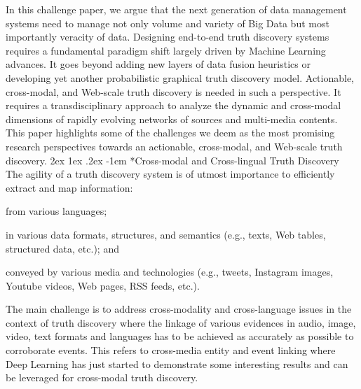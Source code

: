 \documentclass[prodmode,acmtecs]{acmsmall} %
\makeatletter
\renewcommand\paragraph{\@startsection{paragraph}{5}{\z@}%
                                       {2ex \@plus1ex \@minus .2ex}%
                                       {-1em}%
                                      {\sffamily\normalsize\bfseries}}
\makeatother
\begin{document}
 In this challenge paper, we argue that the next generation of data management systems need to 
 manage not only volume and variety of Big Data but most importantly veracity of data. Designing
 end-to-end truth discovery systems requires a fundamental paradigm shift largely driven by Machine Learning advances.
 It goes beyond adding new layers of data fusion heuristics or developing yet another probabilistic graphical truth discovery model. 
 Actionable, cross-modal, and Web-scale truth discovery is needed in such a perspective. It requires a transdisciplinary approach to
 analyze the dynamic and cross-modal dimensions of rapidly evolving networks of sources and multi-media contents. 
This paper highlights some of the challenges we deem as the most promising research perspectives towards an actionable, cross-modal, 
and Web-scale truth discovery.
%
\vspace*{-0.23cm}
\paragraph*{Cross-modal and Cross-lingual Truth Discovery} 
The agility of a truth discovery system is of utmost importance to efficiently extract and map information: 
\begin{inparaenum}[(i)]
\item from various languages;
\item in various data formats, structures, and semantics (e.g., texts, Web tables, structured data, etc.); and
\item  conveyed by various media and technologies (e.g., tweets, Instagram images, Youtube videos, Web pages, RSS feeds, etc.).
\end{inparaenum}
The main challenge is to address cross-modality and cross-language issues in the context of truth discovery where the linkage of various 
evidences in audio, image, video, text formats and languages has to be achieved as accurately as possible to corroborate events. This refers
to cross-media entity and event linking where Deep Learning has just started to demonstrate some interesting results and can be leveraged for
cross-modal truth discovery.
\vspace*{-0.23cm}
\end{document}
